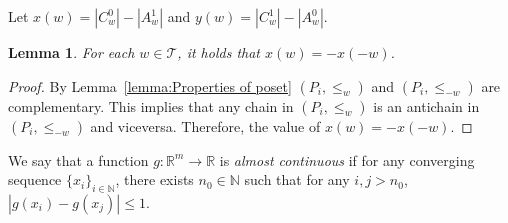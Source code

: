 \documentclass[a4paper, 11pt]{article}
\newtheorem{lemma}[theorem]{Lemma}
\newcommand{\ve}{{\ensuremath{\vec{v}}}}
\newcommand{\we}{{\ensuremath{w}}}
\newcommand{\lt}{\ensuremath{ \leq_{\we}}}
\newcommand{\ltc}{\ensuremath{ \leq_{-\we}}}
\newcommand{\torus}{\ensuremath{\mathcal T}}
\begin{document}
Let $x(\we) = |C^0_{\we}| - |A^1_{\we}|$ and $y(\we) = |C^1_{\we}|- |A^0_{\we}|$.

\begin{lemma}\label{lemma:Properties of x}
For each $\we\in \torus$, it holds that \label{item:Antipodality} $x(\we) = -x(-\we)$.
\end{lemma}
\begin{proof}
By Lemma~\ref{lemma:Properties of poset} $(P_i, \lt)$ and $(P_i, \ltc)$ are complementary. 
This implies that any chain in $(P_i, \lt)$ is an antichain in $(P_i, \ltc)$ and viceversa. 
Therefore, the value of $x(\we) = -x(-\we)$.

\end{proof}

We say that a function $g:\mathbb{R}^m\to \mathbb{R}$ is \emph{almost continuous} if 
for any converging sequence $\{x_i\}_{i\in \mathbb{N}}$, there exists $n_0\in \mathbb{N}$ such that for any $i,j>n_0$, $|g(x_i) - g(x_j)|\leq 1$.
\end{document}
